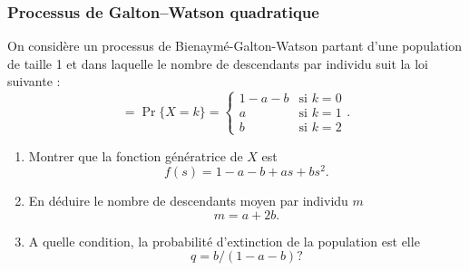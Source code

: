 \subsubsection{Processus de Galton–Watson quadratique \todo{}} %
  On considère un processus de Bienaymé-Galton-Watson partant d'une population de taille 1 et dans laquelle le nombre de descendants par individu suit la loi suivante :
  $$=
  \Pr\{X = k\} = \left\{
    \begin{array}{ll}
      1 - a - b & \text{si $k = 0$} \\
      a & \text{si $k = 1$} \\
      b & \text{si $k = 2$}
    \end{array}\right..
  $$
  \begin{enumerate}
    \item Montrer que la fonction génératrice de $X$ est
    $$
    f(s) = 1 - a - b + as + bs^2.
    $$
    \solution{\todo{}}
    \item En déduire le nombre de descendants moyen par individu $m$
    $$
    m = a + 2b.
    $$
    \item A quelle condition, la probabilité d'extinction de la population est elle
    $$
    q = b/(1 - a - b) ?
    $$
  \end{enumerate}
